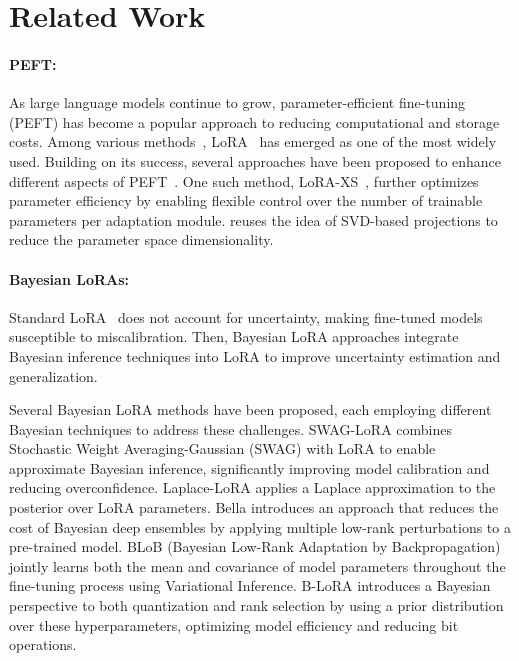 \section{Related Work}
\paragraph{PEFT:} As large language models continue to grow, parameter-efficient fine-tuning (PEFT) has become a popular approach to reducing computational and storage costs. Among various methods~\cite{houlsby2019parameter,guo-etal-2021-parameter,li2021prefix,lester2021power}, LoRA~\cite{hu2021lora} has emerged as one of the most widely used. 
Building on its success, several approaches have been proposed to enhance different aspects of PEFT~\cite{kopiczko2023vera,adalora,dettmers2024qlora}. One such method, LoRA-XS~\cite{balazy2024lora}, further optimizes parameter efficiency by enabling flexible control over the number of trainable parameters per adaptation module. 
\our{} reuses the idea of SVD-based projections to reduce the parameter space dimensionality. 

\paragraph{Bayesian LoRAs:} Standard LoRA~\cite{hu2021lora} does not account for uncertainty, making fine-tuned models susceptible to miscalibration. Then, Bayesian LoRA approaches integrate Bayesian inference techniques into LoRA to improve uncertainty estimation and generalization.

Several Bayesian LoRA methods have been proposed, each employing different Bayesian techniques to address these challenges.  SWAG-LoRA \cite{onal2024gaussian} combines Stochastic Weight Averaging-Gaussian (SWAG) with LoRA to enable approximate Bayesian inference, significantly improving model calibration and reducing overconfidence. Laplace-LoRA \cite{robeyns2024laplaceLora} applies a Laplace approximation to the posterior over LoRA parameters. Bella \cite{doan2025bayesianlowranklearningbella} introduces an approach that reduces the cost of Bayesian deep ensembles by applying multiple low-rank perturbations to a pre-trained model.
%
BLoB (Bayesian Low-Rank Adaptation by Backpropagation) \cite{wang2024blob} jointly learns both the mean and covariance of model parameters throughout the fine-tuning process using Variational Inference. B-LoRA \cite{meo2024bayesianlora} introduces a Bayesian perspective to both quantization and rank selection by using a prior distribution over these hyperparameters, optimizing model efficiency and reducing bit operations.

